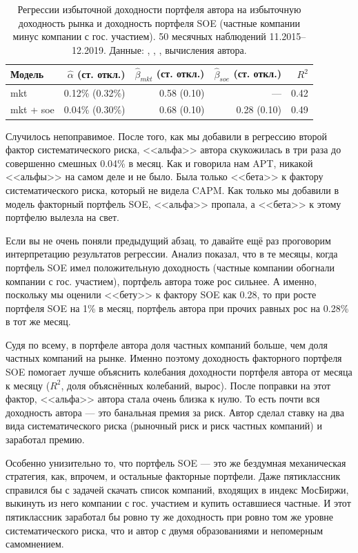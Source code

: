 \begin{table}[ht]
\centering
\begin{tabular}{l|r|r|r|r}
Модель &
$\hat{\alpha}$ (ст. откл.) &
$\hat{\beta}_{mkt}$ (ст. откл.) &
$\hat{\beta}_{soe}$ (ст. откл.) &
$R^2$ \\ \hline
mkt       & 0.12\% (0.32\%) & 0.58 (0.10) & ---         & 0.42 \\
mkt + soe & 0.04\% (0.30\%) & 0.68 (0.10) & 0.28 (0.10) & 0.49
\end{tabular}
\caption{Регрессии избыточной доходности портфеля автора на избыточную 
доходность рынка и доходность портфеля SOE (частные компании минус компании с 
гос. участием). 50 месячных наблюдений 11.2015--12.2019. Данные: 
\cite{moex2020}, \cite{cbr2020}, \cite{capmruWeb}, вычисления автора.}
\label{two_factor_regression_results}
\end{table}

Случилось непоправимое. После того, как мы добавили в регрессию второй фактор 
систематического риска, <<альфа>> автора скукожилась в три раза до совершенно 
смешных 0.04\% в месяц. Как и говорила нам APT, никакой <<альфы>> на самом деле 
и не было. Была только <<бета>> к фактору систематического риска, который не 
видела CAPM. Как только мы добавили в модель факторный портфель SOE, <<альфа>> 
пропала, а <<бета>> к этому портфелю вылезла на свет.

Если вы не очень поняли предыдущий абзац, то давайте ещё раз проговорим 
интерпретацию результатов регрессии. Анализ показал, что в те месяцы, когда 
портфель SOE имел положительную доходность (частные компании обогнали компании с 
гос. участием), портфель автора тоже рос сильнее. А именно, поскольку мы оценили 
<<бету>> к фактору SOE как 0.28, то при росте портфеля SOE на 1\% в месяц, 
портфель автора при прочих равных рос на 0.28\% в тот же месяц.

Судя по всему, в портфеле автора доля частных компаний больше, чем доля частных 
компаний на рынке. Именно поэтому доходность факторного портфеля SOE помогает 
лучше объяснить колебания доходности портфеля автора от месяца к месяцу ($R^2$, 
доля объяснённых колебаний, вырос). После поправки на этот фактор, <<альфа>> 
автора стала очень близка к нулю. То есть почти вся доходность автора --- это 
банальная премия за риск. Автор сделал ставку на два вида систематического риска 
(рыночный риск и риск частных компаний) и заработал премию.

Особенно унизительно то, что портфель SOE --- это же бездумная механическая 
стратегия, как, впрочем, и остальные факторные портфели. Даже пятиклассник 
справился бы с задачей скачать список компаний, входящих в индекс МосБиржи, 
выкинуть из него компании с гос. участием и купить оставшиеся частные. И этот 
пятиклассник заработал бы ровно ту же доходность при ровно том же уровне 
систематического риска, что и автор с двумя образованиями и непомерным 
самомнением.

